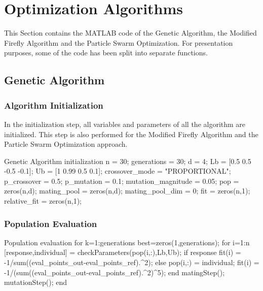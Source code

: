 \section{Optimization Algorithms}

This Section contains the MATLAB code of the Genetic Algorithm,
the Modified Firefly Algorithm and the Particle Swarm Optimization.
For presentation purposes, some of the code has been split into separate functions.

\subsection{Genetic Algorithm}

\subsubsection{Algorithm Initialization}

In the initialization step, all variables and parameters of all the algorithm
are initialized. This step is also performed for the Modified Firefly Algorithm
and the Particle Swarm Optimization approach.

\begin{mylisting}[enhanced,drop shadow,label={alg:genetic_init}]{Genetic Algorithm initialization}
n = 30;                   %
generations = 30;         %
d = 4;                    %
Lb = [0.5 0.5 -0.5 -0.1]; %
Ub = [1 0.99 0.5 0.1];    %
crossover_mode = "PROPORTIONAL";
p_crossover = 0.5;          %
p_mutation = 0.1;           %
mutation_magnitude = 0.05;  %
pop = zeros(n,d);           %
mating_pool = zeros(n,d);   %
mating_pool_dim = 0;
fit = zeros(n,1);           %
relative_fit = zeros(n,1);
\end{mylisting}

\subsubsection{Population Evaluation}

\begin{mylisting}[enhanced,drop shadow,label={alg:population_eval}]{Population evaluation}
for k=1:generations
  best=zeros(1,generations);
  for i=1:n
  [response,individual] = checkParameters(pop(i,:),Lb,Ub);
  if response %
    fit(i) = -1/sum((eval_points_out-eval_points_ref).^2);
  else
    pop(i,:) = individual; %
    fit(i) = -1/(sum((eval_points_out-eval_points_ref).^2)^5);
  end
  matingStep();
  mutationStep();
end
\end{mylisting}

